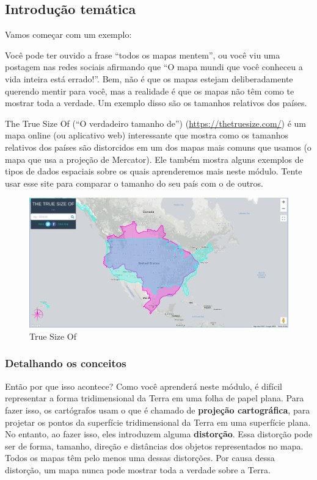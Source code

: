 \documentclass[
]{book}
\begin{document}
\hypertarget{introduuxe7uxe3o-temuxe1tica}{%
\subsection{Introdução temática}\label{introduuxe7uxe3o-temuxe1tica}}

Vamos começar com um exemplo:

Você pode ter ouvido a frase ``todos os mapas mentem'', ou você viu uma postagem nas redes sociais afirmando que ``O mapa mundi que você conheceu a vida inteira está errado!''. Bem, não é que os mapas estejam deliberadamente querendo mentir para você, mas a realidade é que os mapas não têm como te mostrar toda a verdade. Um exemplo disso são os tamanhos relativos dos países.

The True Size Of (``O verdadeiro tamanho de'') (\url{https://thetruesize.com/}) é um mapa online (ou aplicativo web) interessante que mostra como os tamanhos relativos dos países são distorcidos em um dos mapas mais comuns que usamos (o mapa que usa a projeção de Mercator). Ele também mostra alguns exemplos de tipos de dados espaciais sobre os quais aprenderemos mais neste módulo. Tente usar esse site para comparar o tamanho do seu país com o de outros.

\begin{figure}
\centering
\includegraphics{media/modulo0/true-size-of.png}
\caption{True Size Of}
\end{figure}

\hypertarget{detalhando-os-conceitos}{%
\subsubsection{Detalhando os conceitos}\label{detalhando-os-conceitos}}

Então por que isso acontece? Como você aprenderá neste módulo, é difícil representar a forma tridimensional da Terra em uma folha de papel plana. Para fazer isso, os cartógrafos usam o que é chamado de \textbf{projeção cartográfica}, para projetar os pontos da superfície tridimensional da Terra em uma superfície plana. No entanto, ao fazer isso, eles introduzem alguma \textbf{distorção}. Essa distorção pode ser de forma, tamanho, direção e distâncias dos objetos representados no mapa. Todos os mapas têm pelo menos uma dessas distorções. Por causa dessa distorção, um mapa nunca pode mostrar toda a verdade sobre a Terra.
\end{document}
